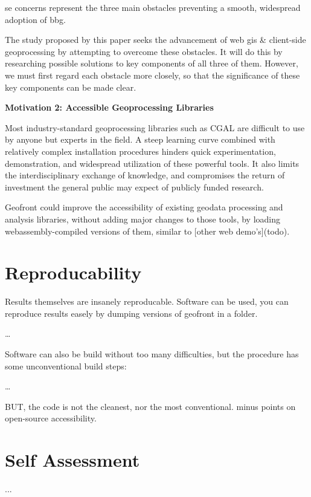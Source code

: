   se concerns represent the three main obstacles preventing a smooth, widespread adoption of \ac{bbg}. 
  
  The study proposed by this paper seeks the advancement of web \ac{gis} \& client-side geoprocessing by attempting to overcome these obstacles. It will do this by researching possible solutions to key components of all three of them. However, we must first regard each obstacle more closely, so that the significance of these key components can be made clear. 
  
  \textbf{Motivation 2: Accessible Geoprocessing Libraries}
  
  Most industry-standard geoprocessing libraries such as CGAL are difficult to use by anyone but experts in the field. A steep learning curve combined with relatively complex installation procedures hinders quick experimentation, demonstration, and widespread utilization of these powerful tools. It also limits the interdisciplinary exchange of knowledge, and compromises the return of investment the general public may expect of publicly funded research.
  
  Geofront could improve the accessibility of existing geodata processing and analysis libraries, without adding major changes to those tools, by loading webassembly-compiled versions of them, similar to [other web demo's](todo).

\section{Reproducability}

Results themselves are insanely reproducable.
Software can be used, you can reproduce results easely by dumping versions of geofront in 
a folder.

\dots

Software can also be build without too many difficulties, but the procedure has some unconventional build steps: 

\dots

BUT, the code is not the cleanest, nor the most conventional. minus points on open-source accessibility.


\section{Self Assessment}

...

